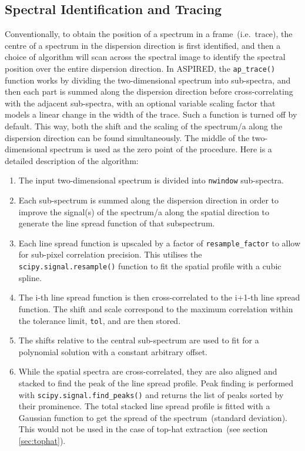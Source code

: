 \documentclass[linenumbers, twocolumn]{aastex631}
\begin{document}
\subsection{Spectral Identification and Tracing}
\label{sec:tracing}
Conventionally, to obtain the position of a spectrum in a frame~(i.e.\ trace),
the centre of a spectrum in the dispersion direction is first identified,
and then a choice of algorithm will scan across the spectral image to identify
the spectral position over the entire dispersion direction. In \textsc{ASPIRED},
the \texttt{ap\_trace()} function works by dividing the two-dimensional spectrum
into sub-spectra, and then each part is summed along the dispersion direction
before cross-correlating with the adjacent sub-spectra, with an optional variable
scaling factor that models a linear change in the width of the trace. Such a
function is turned off by default. This way, both the shift and the scaling of
the spectrum/a along the dispersion direction can be found simultaneously. The
middle of the two-dimensional spectrum is used as the zero point of the procedure. Here is
a detailed description of the algorithm:
\begin{enumerate}
    \item
        The input two-dimensional spectrum is divided into \texttt{nwindow}
        sub-spectra.
    \item
        Each sub-spectrum is summed along the dispersion direction
        in order to improve the signal(s) of the spectrum/a along
        the spatial direction to generate the line spread function
        of that subspectrum.
    \item
        Each line spread function is upscaled by a factor of
        \texttt{resample\_factor} to allow for sub-pixel correlation
        precision. This utilises the \texttt{scipy.signal.resample()}
        function to fit the spatial profile with a cubic spline.
    \item
        The i-th line spread function is then cross-correlated to the i+1-th
        line spread function. The shift and scale correspond to the maximum
        correlation within the tolerance limit, \texttt{tol}, and are then stored.
    \item
        The shifts relative to the central sub-spectrum are used to
        fit for a polynomial solution with a constant arbitrary offset.
    \item
        While the spatial spectra are cross-correlated, they are also
        aligned and stacked to find the peak of the line spread profile.
        Peak finding is performed with \texttt{scipy.signal.find\_peaks()}
        and returns the list of peaks sorted by their prominence. The
        total stacked line spread profile is fitted with a Gaussian
        function to get the spread of the spectrum~(standard deviation).
        This would not be used in the case of top-hat
        extraction~(see section \textsection\ref{sec:tophat}).
\end{enumerate}
\end{document}

